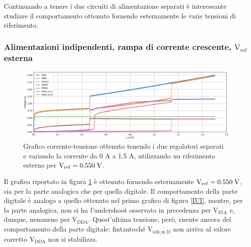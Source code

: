 Continuando a tenere i due circuiti di alimentazione separati è interessante studiare il comportamento ottenuto fornendo esternamente le varie tensioni di riferimento.

\subsubsection{Alimentazioni indipendenti, rampa di corrente crescente, $\mathrm{V_{ref}}$ esterna} 

\begin{figure}
\centering
\includegraphics[width=\textwidth]{Immagini/IUEVref2}
\caption{Grafico corrente-tensione ottenuto tenendo i due regolatori separati e variando la corrente da 0 A a 1.5 A, utilizzando un riferimento esterno per $\mathrm{V_{ref}}=0.550 \rm \; V$.}
\label{IUEVref}
\end{figure}
Il grafico riportato in figura \ref{IUEVref} è ottenuto fornendo esternamente  $\mathrm{V_{ref}}=0.550 \rm \; V$,  sia per la parte analogica che per quella digitale.
Il comportamento della parte digitale è analogo a quello ottenuto nel primo grafico di figura \ref{IUI}, mentre, per la parte analogica, non si ha l'undershoot osservato in precedenza per $\mathrm{V_{INA}}$ e, dunque, nemmeno per $\mathrm{V_{DDA}}$.
Quest'ultima tensione, però, risente ancora del comportamento della parte digitale: fintantoché $\mathrm{V_{iofs\_ m \_ D}}$ non arriva al valore corretto $\mathrm{V_{DDA}}$ non si stabilizza.

% 
%
%

